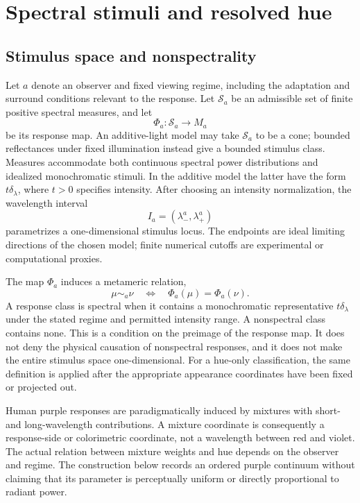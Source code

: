 \documentclass[11pt,letterpaper]{article}
\theoremstyle{plain}
\begin{document}
\section{Spectral stimuli and resolved hue}
\label{sec:hue}
\subsection{Stimulus space and nonspectrality}
Let $a$ denote an observer and fixed viewing regime, including the adaptation and surround conditions relevant to the response. Let $\mathcal S_a$ be an admissible set of finite positive spectral measures, and let
\begin{equation}
 \Phi_a:\mathcal S_a\longrightarrow M_a
 \label{eq:response}
\end{equation}
be its response map. An additive-light model may take $\mathcal S_a$ to be a cone; bounded reflectances under fixed illumination instead give a bounded stimulus class. Measures accommodate both continuous spectral power distributions and idealized monochromatic stimuli. In the additive model the latter have the form $t\delta_\lambda$, where $t>0$ specifies intensity. After choosing an intensity normalization, the wavelength interval
\begin{equation}
 I_a=(\lambda_-^a,\lambda_+^a)
 \label{eq:interval}
\end{equation}
parametrizes a one-dimensional stimulus locus. The endpoints are ideal limiting directions of the chosen model; finite numerical cutoffs are experimental or computational proxies.

The map $\Phi_a$ induces a metameric relation,
\begin{equation}
 \mu\sim_a\nu\quad\Longleftrightarrow\quad\Phi_a(\mu)=\Phi_a(\nu).
 \label{eq:metamerism}
\end{equation}
A response class is spectral when it contains a monochromatic representative $t\delta_\lambda$ under the stated regime and permitted intensity range. A nonspectral class contains none. This is a condition on the preimage of the response map. It does not deny the physical causation of nonspectral responses, and it does not make the entire stimulus space one-dimensional. For a hue-only classification, the same definition is applied after the appropriate appearance coordinates have been fixed or projected out.

Human purple responses are paradigmatically induced by mixtures with short- and long-wavelength contributions. A mixture coordinate is consequently a response-side or colorimetric coordinate, not a wavelength between red and violet. The actual relation between mixture weights and hue depends on the observer and regime. The construction below records an ordered purple continuum without claiming that its parameter is perceptually uniform or directly proportional to radiant power.
\end{document}
